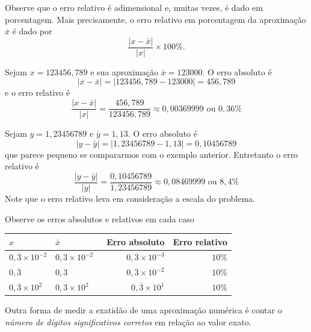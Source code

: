\begin{obs}
  Observe que o erro relativo é adimensional e, muitas vezes, é dado em porcentagem. Mais precisamente, o erro relativo em porcentagem da aproximação $\overline{x}$ é dado por
  \begin{equation*}
    \frac{|x-\bar{x}|}{|x|}\times 100 \%.
  \end{equation*}
\end{obs}

\begin{ex}
Sejam $x=123456,789$ e sua aproximação $\bar{x}=123000$. O erro absoluto é
$$
|x-\bar{x}|=|123456,789-123000|=456,789
$$
e o erro relativo é
$$
\frac{|x-\bar{x}|}{|x|}=\frac{456,789}{123456,789}\approx 0,00369999 \text{ ou }0,36\%
$$
\end{ex}

\begin{ex}
Sejam $y=1,23456789$ e $\bar{y}=1,13$. O erro absoluto é
$$
|y-\bar{y}|=|1,23456789-1,13|=0,10456789
$$
que parece pequeno se compararmos com o exemplo anterior. Entretanto o erro relativo é
$$
\frac{|y-\bar{y}|}{|y|}=\frac{0,10456789}{1,23456789}\approx 0,08469999 \text{ ou }8,4\%
$$
Note que o erro relativo leva em consideração a escala do problema.
\end{ex}



\begin{ex}
Observe os erros absolutos e relativos em cada caso
\begin{center}
  \begin{tabular}{ll|rr} \hline
    $x$ & $\bar{x}$ &\ Erro absoluto & Erro relativo\\\hline
    $0,\overline{3}\times 10^{-2}$ & $0,3\times 10^{-2}$ & $0,\overline{3}\times 10^{-3}$ & $10\%$\\ 
    $0,\overline{3}$              & $0,3$ & $0,\overline{3}\times 10^{-2}$ & $10\%$\\ 
    $0,\overline{3}\times 10^{2}$ & $0,3\times 10^{2}$ & $0,\overline{3}\times 10^{1}$ & $10\%$\\\hline
\end{tabular}  
\end{center}
\end{ex}

Outra forma de medir a exatidão de uma aproximação numérica é contar o \emph{número de dígitos significativos corretos} em relação ao valor exato.

